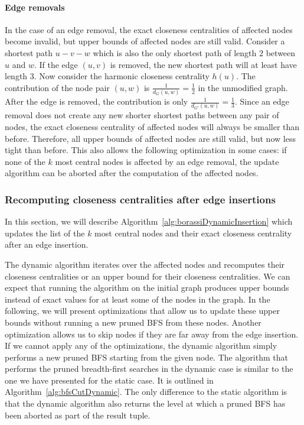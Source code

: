 \paragraph{Edge removals}
In the case of an edge removal, the exact closeness centralities of affected nodes become invalid, but upper bounds of affected nodes are still valid. Consider a shortest path $u - v - w$ which is also the only shortest path of length $2$ between $u$ and $w$. If the edge $(u, v)$ is removed, the new shortest path will at least have length $3$. Now consider the harmonic closeness centrality $h(u)$. The contribution of the node pair $(u, w)$ is $\frac{1}{d_G(u, w)} = \frac{1}{2}$ in the unmodified graph. After the edge is removed, the contribution is only $\frac{1}{d_{G'}(u, w)} = \frac{1}{3}$. Since an edge removal does not create any new shorter shortest paths between any pair of nodes, the exact closeness centrality of affected nodes will always be smaller than before. Therefore, all upper bounds of affected nodes are still valid, but now less tight than before. This also allows the following optimization in some cases: if none of the $k$ most central nodes is affected by an edge removal, the update algorithm can be aborted after the computation of the affected nodes. 


\subsubsection{Recomputing closeness centralities after edge insertions}
\label{sec:dynamicComplexRecomputation}
In this section, we will describe Algorithm~\ref{alg:borassiDynamicInsertion} which updates the list of the $k$ most central nodes and their exact closeness centrality after an edge insertion. 

The dynamic algorithm iterates over the affected nodes and recomputes their closeness centralities or an upper bound for their closeness centralities. We can expect that running the algorithm on the initial graph produces upper bounds instead of exact values for at least some of the nodes in the graph. In the following, we will present optimizations that allow us to update these upper bounds without running a new pruned BFS from these nodes. Another optimization allows us to skip nodes if they are far away from the edge insertion. If we cannot apply any of the optimizations, the dynamic algorithm simply performs a new pruned BFS starting from the given node. The algorithm that performs the pruned breadth-first searches in the dynamic case is similar to the one we have presented for the static case. It is outlined in Algorithm~\ref{alg:bfsCutDynamic}. The only difference to the static algorithm is that the dynamic algorithm also returns the level at which a pruned BFS has been aborted as part of the result tuple.


